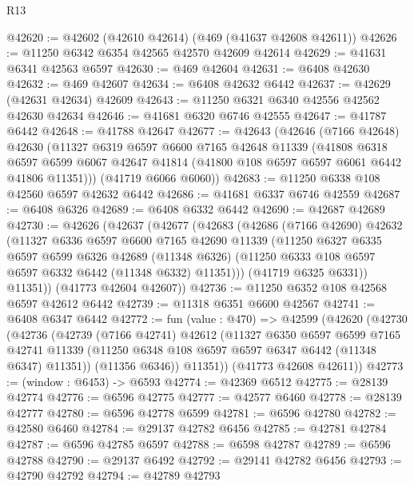 \begin{lexlean}{R13}
\begin{coremodule}
@42620 := @42602 (@42610 @42614) (@469 (@41637 @42608 @42611))
@42626 := @11250 @6342 @6354 @42565 @42570 @42609 @42614
@42629 := @41631 @6341 @42563 @6597
@42630 := @469 @42604
@42631 := @6408 @42630
@42632 := @469 @42607
@42634 := @6408 @42632 @6442
@42637 := @42629 (@42631 @42634) @42609
@42643 := @11250 @6321 @6340 @42556 @42562 @42630 @42634
@42646 := @41681 @6320 @6746 @42555
@42647 := @41787 @6442
@42648 := @41788 @42647
@42677 := @42643
    (@42646
      (@7166 @42648)
      @42630
      (@11327
        @6319
        @6597
        @6600
        @7165
        @42648
        @11339
        (@41808
          @6318
          @6597
          @6599
          @6067
          @42647
          @41814
          (@41800 @108 @6597 @6597 @6061 @6442 @41806 @11351)))
      (@41719 @6066 @6060))
@42683 := @11250 @6338 @108 @42560 @6597 @42632 @6442
@42686 := @41681 @6337 @6746 @42559
@42687 := @6408 @6326
@42689 := @6408 @6332 @6442
@42690 := @42687 @42689
@42730 := @42626
    (@42637
      (@42677
        (@42683
          (@42686
            (@7166 @42690)
            @42632
            (@11327
              @6336
              @6597
              @6600
              @7165
              @42690
              @11339
              (@11250
                @6327
                @6335
                @6597
                @6599
                @6326
                @42689
                (@11348 @6326)
                (@11250 @6333 @108 @6597 @6597 @6332 @6442 (@11348 @6332) @11351)))
            (@41719 @6325 @6331))
          @11351))
      (@41773 @42604 @42607))
@42736 := @11250 @6352 @108 @42568 @6597 @42612 @6442
@42739 := @11318 @6351 @6600 @42567
@42741 := @6408 @6347 @6442
@42772 := fun (value : @470) =>
  @42599
    (@42620
      (@42730
        (@42736
          (@42739
            (@7166 @42741)
            @42612
            (@11327
              @6350
              @6597
              @6599
              @7165
              @42741
              @11339
              (@11250 @6348 @108 @6597 @6597 @6347 @6442 (@11348 @6347) @11351))
            (@11356 @6346))
          @11351))
      (@41773 @42608 @42611))
@42773 := (window : @6453) -> @6593
@42774 := @42369 @6512
@42775 := @28139 @42774
@42776 := @6596 @42775
@42777 := @42577 @6460
@42778 := @28139 @42777
@42780 := @6596 @42778 @6599
@42781 := @6596 @42780
@42782 := @42580 @6460
@42784 := @29137 @42782 @6456
@42785 := @42781 @42784
@42787 := @6596 @42785 @6597
@42788 := @6598 @42787
@42789 := @6596 @42788
@42790 := @29137 @6492
@42792 := @29141 @42782 @6456
@42793 := @42790 @42792
@42794 := @42789 @42793

\end{coremodule}
\end{lexlean}
